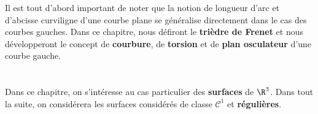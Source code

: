 Il est tout d'abord important de noter que la notion de longueur d'arc et d'abcisse curviligne d'une courbe plane se généralise directement dans le cas des courbes gauches. Dans ce chapitre, nous défiront le \textbf{trièdre de Frenet} et nous développeront le concept de \textbf{courbure}, de \textbf{torsion} et de \textbf{plan osculateur} d'une courbe gauche.
\chapter*{} %

Dans ce chapitre, on s'intéresse au cas particulier des \textbf{surfaces} de \(\R^3\). Dans tout la suite, on considérera les surfaces considérés de classe \(\mathcal{C}^1\) et \textbf{régulières}.


